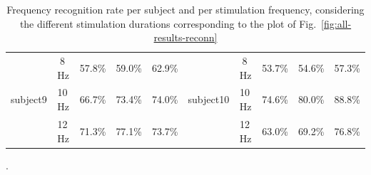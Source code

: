 \documentclass[smallextended]{svjour3}
\begin{document}
\begin{table}[ht]
\begin{center}
\begin{tabular}{ r | c | c | c | c || r | c | c | c | c }
        \hline

        \multirow{3}{*}{subject9} &  8\,Hz & 57.8\% & 59.0\% & 62.9\% & \multirow{3}{*}{subject10} &  8\,Hz & 53.7\% & 54.6\% & 57.3\% \\
                                  & 10\,Hz & 66.7\% & 73.4\% & 74.0\% & & 10\,Hz & 74.6\% & 80.0\% & 88.8\% \\
                                  & 12\,Hz & 71.3\% & 77.1\% & 73.7\% & & 12\,Hz & 63.0\% & 69.2\% & 76.8\% \\

        \hline
                                  

    \end{tabular}
    \caption{Frequency recognition rate per subject and per stimulation frequency, considering the different stimulation durations corresponding to the plot of Fig.~\ref{fig:all-results-reconn}}.
\end{center}\end{table}
\end{document}
